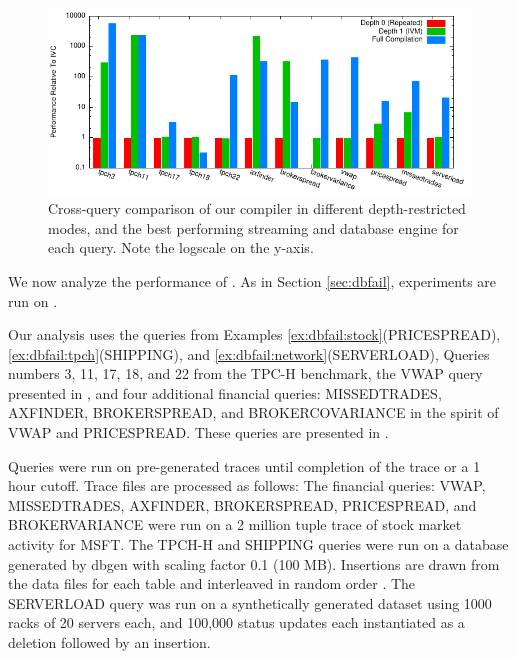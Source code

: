 
\begin{figure}
\begin{center}
\includegraphics[width=\textwidth]{../graphs/graphs/bakeoff.pdf}
\caption{Cross-query comparison of our compiler in different depth-restricted modes, and the best performing streaming and database engine for each query.  Note the logscale on the y-axis.}
\label{fig:experiments:bakeoff}
\end{center}
\end{figure}

We now analyze the performance of \dbtoaster.  As in Section \ref{sec:dbfail}, experiments are run on . 
 
Our analysis uses the queries from Examples \ref{ex:dbfail:stock}(PRICESPREAD),  \ref{ex:dbfail:tpch}(SHIPPING), and \ref{ex:dbfail:network}(SERVERLOAD), Queries numbers 3, 11, 17, 18, and 22 from the TPC-H\cite{tpch} benchmark, the VWAP query presented in \cite{kennedy-ahmad-koch-cidr:11}, and four additional financial queries: MISSEDTRADES, AXFINDER, BROKERSPREAD, and BROKERCOVARIANCE in the spirit of VWAP and PRICESPREAD.  These queries are presented in .

Queries were run on pre-generated traces until completion of the trace or a 1 hour cutoff.  Trace files are processed as follows: The financial queries: VWAP, MISSEDTRADES, AXFINDER, BROKERSPREAD, PRICESPREAD, and BROKERVARIANCE were run on a 2 million tuple trace of stock market activity for MSFT.  The TPCH-H and SHIPPING queries were run on a database generated by dbgen\cite{tpch} with scaling factor 0.1 (100 MB).  Insertions are drawn from the data files for each table and interleaved in random order .  The SERVERLOAD query was run on a synthetically generated dataset using 1000 racks of 20 servers each, and 100,000 status updates each instantiated as a deletion followed by an insertion.

